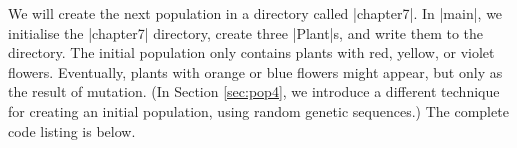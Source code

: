 We will create the next population in a directory called |chapter7|.
In |main|, we initialise the |chapter7| directory, create three 
|Plant|s, and write them to the directory.
The initial population only contains plants with red, yellow, 
or violet flowers.
Eventually, plants with orange or blue flowers might appear, but only
as the result of mutation.
(In Section \ref{sec:pop4}, we introduce a different technique for creating
an initial population, using random genetic sequences.)
The complete code listing is below.


